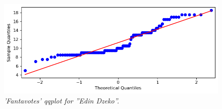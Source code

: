 \begin{figure}[H]
  \includegraphics[scale=0.5]{images/dzeko_normality_test_fantavoti_qqplot.png}
   \caption{\textit{'Fantavotes' qqplot for ''Edin Dzeko''.}}
  \label{fig:qqplot_fantavotes}
\end{figure}






  